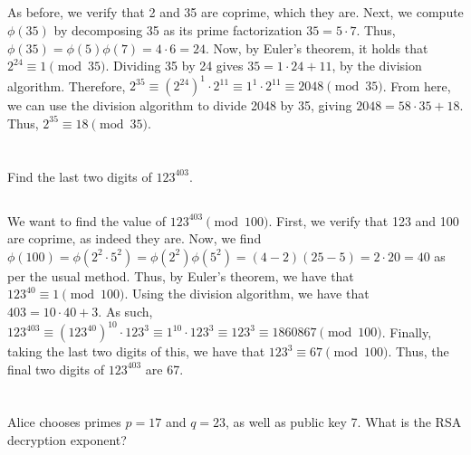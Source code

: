 \documentclass{article}
\begin{document}
\subsection{}

As before, we verify that 2 and 35 are coprime, which they are. Next, we compute $\phi(35)$ by decomposing 35 as its prime factorization $35 = 5 \cdot 7$. Thus, $\phi(35) = \phi(5)\phi(7) = 4 \cdot 6 = 24$. Now, by Euler's theorem, it holds that $2^{24} \equiv 1 \pmod{35}$. Dividing 35 by 24 gives $35 = 1 \cdot 24 + 11$, by the division algorithm. Therefore, $2^{35} \equiv (2^{24})^1 \cdot 2^{11} \equiv 1^1 \cdot 2^{11} \equiv 2048 \pmod{35}$. From here, we can use the division algorithm to divide 2048 by 35, giving $2048 = 58 \cdot 35 + 18$. Thus, $2^{35} \equiv 18 \pmod{35}$.

\section{}

Find the last two digits of $123^{403}$.

\subsection{}

We want to find the value of $123^{403} \pmod{100}$. First, we verify that 123 and 100 are coprime, as indeed they are. Now, we find $\phi(100) = \phi(2^2 \cdot 5^2) = \phi(2^2)\phi(5^2) = (4 - 2)(25 - 5) = 2 \cdot 20 = 40$ as per the usual method. Thus, by Euler's theorem, we have that $123^{40} \equiv 1 \pmod{100}$. Using the division algorithm, we have that $403 = 10 \cdot 40 + 3$. As such, $123^{403} \equiv (123^{40})^10 \cdot 123^3 \equiv 1^10 \cdot 123^3 \equiv 123^3 \equiv 1860867 \pmod{100}$. Finally, taking the last two digits of this, we have that $123^3 \equiv 67 \pmod{100}$. Thus, the final two digits of $123^{403}$ are 67.

\section{}

Alice chooses primes $p=17$ and $q=23$, as well as public key 7. What is the RSA decryption exponent?

\subsection{}
\end{document}
